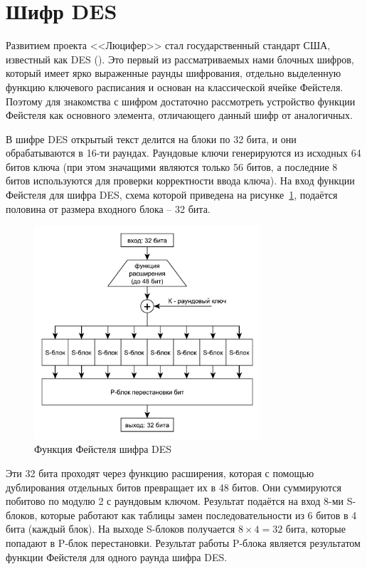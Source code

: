 \section{Шифр DES}

Развитием проекта <<Люцифер>> стал государственный стандарт США, известный как DES (). Это первый из рассматриваемых нами блочных шифров, который имеет ярко выраженные раунды шифрования, отдельно выделенную функцию ключевого расписания и основан на классической ячейке Фейстеля. Поэтому для знакомства с шифром достаточно рассмотреть устройство функции Фейстеля как основного элемента, отличающего данный шифр от аналогичных.

В шифре DES открытый текст делится на блоки по 32 бита, и они обрабатываются в 16-ти раундах. Раундовые ключи генерируются из исходных 64 битов ключа (при этом значащими являются только 56 битов, а последние 8 битов используются для проверки корректности ввода ключа). На вход функции Фейстеля для шифра DES, схема которой приведена на рисунке~\ref{fig:des}, подаётся половина от размера входного блока -- 32 бита.

\begin{figure}[!htb]
    \centering
    \includegraphics[width=0.75\textwidth]{pic/des}
    \caption{Функция Фейстеля шифра DES\label{fig:des}}
\end{figure}

Эти 32 бита проходят через функцию расширения, которая с помощью дублирования отдельных битов превращает их в 48 битов. Они суммируются побитово по модулю 2 с раундовым ключом. Результат подаётся на вход 8-ми S-блоков, которые работают как таблицы замен последовательности из 6 битов в 4 бита (каждый блок). На выходе S-блоков получается $8 \times 4 = 32$ бита, которые попадают в P-блок перестановки. Результат работы P-блока является результатом функции Фейстеля для одного раунда шифра DES.

